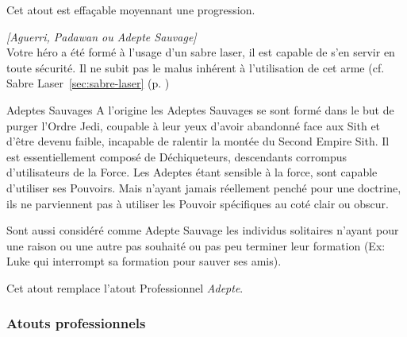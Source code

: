 \begin{description}[align=left]
        Cet atout est effaçable moyennant une progression.

    \item [Sabre laser]
        \emph{[Aguerri, Padawan ou Adepte Sauvage]}\\
        Votre héro a été formé à l’usage d’un sabre laser, il est capable de s’en servir en toute sécurité. Il ne subit pas le malus inhérent à l’utilisation de cet arme (cf. Sabre Laser~\ref{sec:sabre-laser} (p. \pageref{sec:sabre-laser})
        
\end{description}

\begin{paperbox}{Adeptes Sauvages}
A l’origine les Adeptes Sauvages se sont formé dans le but de purger l’Ordre Jedi, coupable à leur yeux d’avoir abandonné face aux Sith et d’être devenu faible, incapable de ralentir la montée du Second Empire Sith. Il est essentiellement composé de Déchiqueteurs, descendants corrompus d’utilisateurs de la Force. Les Adeptes étant sensible à la force, sont capable d’utiliser ses Pouvoirs. Mais n’ayant jamais réellement penché pour une doctrine, ils ne parviennent pas à utiliser les Pouvoir spécifiques au coté clair ou obscur.

Sont aussi considéré comme Adepte Sauvage les individus solitaires n’ayant pour une raison ou une autre pas souhaité ou pas peu terminer leur formation (Ex: Luke qui interrompt sa formation pour sauver ses amis). 

Cet atout remplace l’atout Professionnel \emph{Adepte}.
\end{paperbox}

\newpage
\subsubsection{Atouts professionnels}

